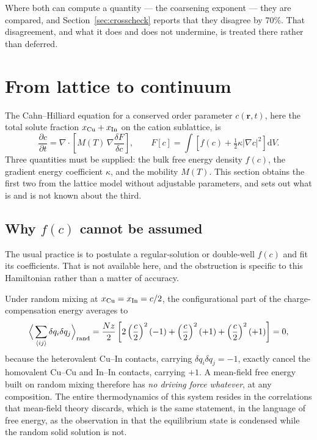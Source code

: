\documentclass[preprint,12pt,authoryear]{elsarticle}
\begin{document}
Where both can compute a quantity --- the coarsening exponent --- they are
compared, and Section~\ref{sec:crosscheck} reports that they disagree by 70\%.
That disagreement, and what it does and does not undermine, is treated there
rather than deferred.

\section{From lattice to continuum}
\label{sec:bridge}

The Cahn--Hilliard equation \citep{cahn1958} for a conserved order parameter
$c(\mathbf{r}, t)$,
here the total solute fraction $x_{\rm Cu} + x_{\rm In}$ on the cation
sublattice, is
\begin{equation}
\frac{\partial c}{\partial t}
  = \nabla \cdot \left[ M(T)\, \nabla \frac{\delta F}{\delta c} \right],
\qquad
F[c] = \int \left[ f(c) + \tfrac{1}{2}\kappa \left|\nabla c\right|^2 \right] \mathrm{d}V .
\label{eq:ch}
\end{equation}
Three quantities must be supplied: the bulk free energy density $f(c)$, the
gradient energy coefficient $\kappa$, and the mobility $M(T)$. This section
obtains the first two from the lattice model without adjustable parameters, and
sets out what is and is not known about the third.

\subsection{Why $f(c)$ cannot be assumed}
\label{sec:whynotregular}

The usual practice is to postulate a regular-solution or double-well $f(c)$ and
fit its coefficients. That is not available here, and the obstruction is
specific to this Hamiltonian rather than a matter of accuracy.

Under random mixing at $x_{\rm Cu} = x_{\rm In} = c/2$, the configurational part
of the charge-compensation energy averages to
\begin{equation}
\Big\langle \sum_{\langle ij \rangle} \delta q_i \delta q_j \Big\rangle_{\rm rand}
= \frac{Nz}{2}\left[ 2\left(\frac{c}{2}\right)^2(-1)
                   + \left(\frac{c}{2}\right)^2(+1)
                   + \left(\frac{c}{2}\right)^2(+1) \right] = 0,
\label{eq:mfzero}
\end{equation}
because the heterovalent Cu--In contacts, carrying $\delta q_i \delta q_j = -1$,
exactly cancel the homovalent Cu--Cu and In--In contacts, carrying $+1$. A
mean-field free energy built on random mixing therefore has \emph{no driving
force whatever}, at any composition. The entire thermodynamics of this system
resides in the correlations that mean-field theory discards, which is the same
statement, in the language of free energy, as the observation in
\citet{yu2026b} that the equilibrium state is condensed while the random solid
solution is not.
\end{document}
